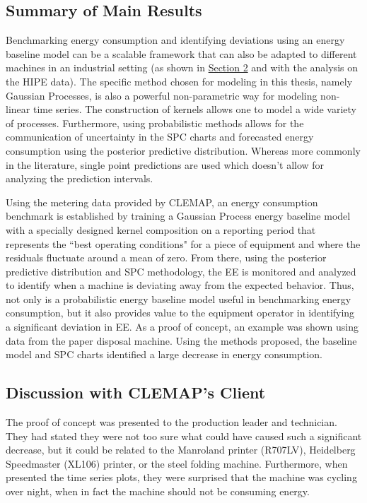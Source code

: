 \subsection{Summary of Main Results}

Benchmarking energy consumption and identifying deviations using an energy baseline model can be a scalable framework that can also be adapted to different machines in an industrial setting (as shown in \hyperlink{section.2}{Section 2} and with the analysis on the HIPE data). The specific method chosen for modeling in this thesis, namely Gaussian Processes, is also a powerful non-parametric way for modeling non-linear time series. The construction of kernels allows one to model a wide variety of processes. Furthermore, using probabilistic methods allows for the communication of uncertainty in the SPC charts and forecasted energy consumption using the posterior predictive distribution. Whereas more commonly in the literature, single point predictions are used which doesn't allow for analyzing the prediction intervals. 

Using the metering data provided by CLEMAP, an energy consumption benchmark is established by training a Gaussian Process energy baseline model with a specially designed kernel composition on a reporting period that represents the ``best operating conditions" for a piece of equipment and where the residuals fluctuate around a mean of zero. From there, using the posterior predictive distribution and SPC methodology, the EE is monitored and analyzed to identify when a machine is deviating away from the expected behavior. Thus, not only is a probabilistic energy baseline model useful in benchmarking energy consumption, but it also provides value to the equipment operator in identifying a significant deviation in EE. As a proof of concept, an example was shown using data from the paper disposal machine. Using the methods proposed, the baseline model and SPC charts identified a large decrease in energy consumption. 

\subsection{Discussion with CLEMAP's Client}

The proof of concept was presented to the production leader and technician. They had stated they were not too sure what could have caused such a significant decrease, but it could be related to the Manroland printer (R707LV), Heidelberg Speedmaster (XL106) printer, or the steel folding machine. Furthermore, when presented the time series plots, they were surprised that the machine was cycling over night, when in fact the machine should not be consuming energy.

